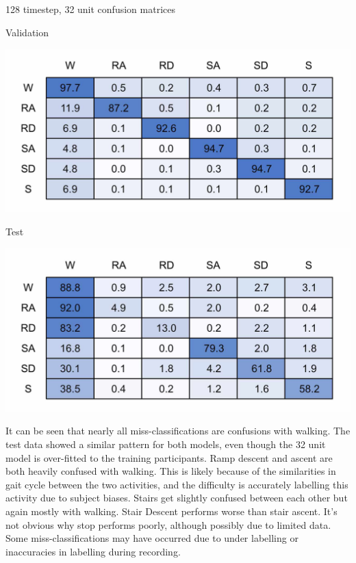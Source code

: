 \documentclass[sensors,article,submit,moreauthors,pdftex]{Definitions/mdpi}
\begin{document}
\begin{table}[!hbt]
    \centering
    \caption{128 timestep, 32 unit confusion matrices}
    \label{tab:128x32_full_model_confusion_matrix}
    \begin{subtable}{.45\textwidth}
        \centering
        \caption{Validation}
        \label{tab:full_model_conf_matrix_training_128x32}
        \includegraphics[width=\textwidth]{Figures/results/conf_matricies/Training_128x32_NT.jpg}
    \end{subtable}
    \hfil
    \begin{subtable}{.45\textwidth}
        \centering
        \caption{Test}
        \label{tab:full_model_conf_matrix_test_128x32}
        \includegraphics[width=\textwidth]{Figures/results/conf_matricies/Test_128x32_NT.jpg}
    \end{subtable}
\end{table}

It can be seen that nearly all miss-classifications are confusions with walking. The test data showed a similar pattern for both models, even though the 32 unit model is over-fitted to the training participants. Ramp descent and ascent are both heavily confused with walking. This is likely because of the similarities in gait cycle between the two activities, and the difficulty is accurately labelling this activity due to subject biases. Stairs get slightly confused between each other but again mostly with walking. Stair Descent performs worse than stair ascent. It's not obvious why stop performs poorly, although possibly due to limited data. Some miss-classifications may have occurred due to under labelling or inaccuracies in labelling during recording.
\end{document}
